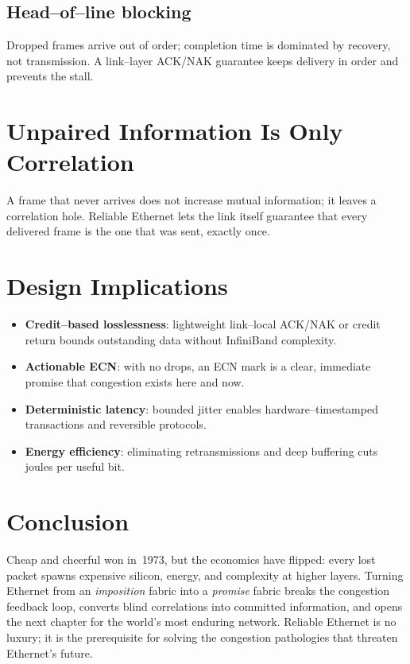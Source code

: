 \documentclass[../HFT-main.tex]{subfiles}
\begin{document}
\subsection{Head--of--line blocking}
Dropped frames arrive out of order; completion time is dominated by
recovery, not transmission.  A link--layer ACK/NAK guarantee keeps delivery
in order and prevents the stall.

\section{Unpaired Information Is Only Correlation}
A frame that never arrives does not increase mutual information; it leaves
a correlation hole.  Reliable Ethernet lets the link itself guarantee that
every delivered frame is the one that was sent, exactly once.

\section{Design Implications}
\begin{itemize}
  \item \textbf{Credit--based losslessness}: lightweight link--local
  ACK/NAK or credit return bounds outstanding data without InfiniBand
  complexity.

  \item \textbf{Actionable ECN}: with no drops, an ECN mark is a clear,
  immediate promise that congestion exists here and now.

  \item \textbf{Deterministic latency}: bounded jitter enables
  hardware--timestamped transactions and reversible protocols.

  \item \textbf{Energy efficiency}: eliminating retransmissions and deep
  buffering cuts joules per useful bit.
\end{itemize}

\section{Conclusion}
Cheap and cheerful won in 1973, but the economics have flipped: every lost
packet spawns expensive silicon, energy, and complexity at higher layers.
Turning Ethernet from an \emph{imposition} fabric into a \emph{promise}
fabric breaks the congestion feedback loop, converts blind correlations
into committed information, and opens the next chapter for the world's most
enduring network.  Reliable Ethernet is no luxury; it is the prerequisite
for solving the congestion pathologies that threaten Ethernet's future.
\end{document}
